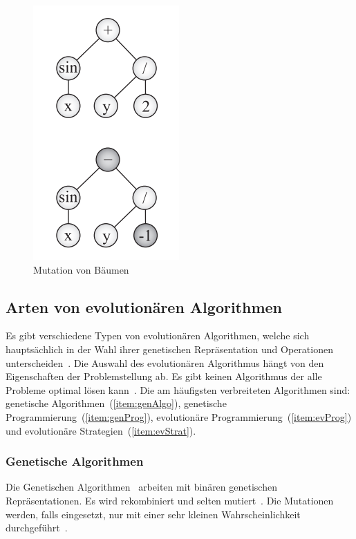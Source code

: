         \begin{figure}[H]
            \includegraphics[scale=0.8,center]{graphics/mutation_tree}
            \caption[\protect{}, S.29]{Mutation von Bäumen\label{fig:MutationTree}}
        \end{figure}

    \subsection{Arten von evolutionären Algorithmen\label{sub:artenEvAlgos}}

      Es gibt verschiedene Typen von evolutionären Algorithmen, welche sich hauptsächlich in der Wahl ihrer
      genetischen Repräsentation und Operationen unterscheiden~\cite{book:introEvComp}.
      Die Auswahl des evolutionären Algorithmus hängt von den Eigenschaften der Problemstellung ab.
      Es gibt keinen Algorithmus der alle Probleme optimal lösen kann~\cite{book:genAlgoDataStructsEvProg}.
      Die am häufigsten verbreiteten Algorithmen sind: genetische Algorithmen~(\vref{item:genAlgo}),
      genetische Programmierung~(\vref{item:genProg}), evolutionäre Programmierung~(\vref{item:evProg})
      und evolutionäre Strategien~(\vref{item:evStrat}).

      \subsubsection{Genetische Algorithmen\label{item:genAlgo}}

        Die Genetischen Algorithmen~\cite{book:adapNaturalArtSys} arbeiten mit binären genetischen Repräsentationen.
        Es wird rekombiniert und selten mutiert~\cite[S.128]{book:evAlgo}.
        Die Mutationen werden, falls eingesetzt,
        nur mit einer sehr kleinen Wahrscheinlichkeit durchgeführt~\cite[S.128]{book:evAlgo}.

